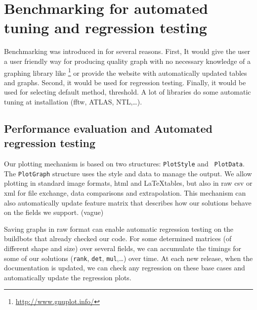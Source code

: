\section{Benchmarking  for automated tuning and regression testing}\label{sec:bench}
%
Benchmarking was introduced in \linbox for several reasons. First, It would
give the user a user friendly way for producing quality graph with no necessary
knowledge of a graphing library like \gnuplot%
%
%
\footnote{\url{http://www.gnuplot.info/}}
%
or provide the \linbox website with automatically updated tables and graphs.
Second, it would be used for regression testing.  Finally, it would be used for
selecting default method, threshold. A lot of libraries do some automatic tuning
at installation (\textsf{fftw}, \textsf{ATLAS}, \textsf{NTL},\ldots).
%
\par
%
%
%
\subsection{Performance evaluation and Automated regression testing}
%
Our plotting mechanism is based on two structures: {\tt PlotStyle} and {\tt
PlotData}. The  {\tt PlotGraph} structure uses the style and data to manage the
output.  We allow plotting in standard image formats, html and \LaTeX tables,
but also in raw csv or xml for file exchange, data comparisons and
extrapolation. This mechanism can also automatically update \linbox feature
matrix that describes how our solutions behave on the fields we support. (vague)
%
\par
%
% 
%
%
%
Saving graphs in raw format can enable automatic regression testing on the
buildbots that already checked our code. For some determined matrices (of
different shape and size) over several fields, we can accumulate the timings
for some of our solutions ({\tt rank}, {\tt det}, {\tt mul},\ldots) over time.
At each new release, when the documentation is updated, we can check any
regression on these base cases and automatically update the regression plots.
%

